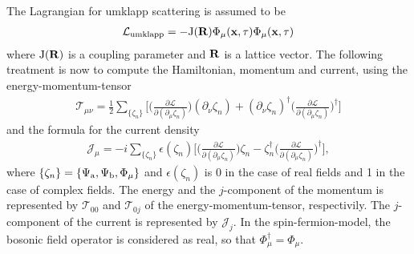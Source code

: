 %
The Lagrangian for umklapp scattering is assumed to be 
%
\begin{align}
	\mathcal{L}_{\mathrm{umklapp}}= -\mathrm{J}(\vb{R}) \Phi_{\mu}(\vb{x},\tau) \Phi_{\mu}(\vb{x},\tau)
\end{align}
%
where $\mathrm{J}(\vb{R})$ is a coupling parameter and $\vb{R}$ is a lattice vector.
The following treatment is now to compute the Hamiltonian, momentum and current, using the energy-momentum-tensor
%
\begin{align}
	\mathcal{T}_{\mu\nu} = 
		\frac{1}{2} \sum\limits_{\{\zeta_{n}\}} \bigg[ 
		\Big(\frac{\partial\mathcal{L}}{\partial(\partial_{\mu}\zeta_{n})}\Big) (\partial_{\nu}\zeta_{n}) 
		+
		(\partial_{\nu}\zeta_{n})^{\dag} \Big(\frac{\partial\mathcal{L}}{\partial(\partial_{\mu}\zeta_{n})}\Big)^{\dag}
		\bigg]
\end{align}
%
and the formula for the current density
%
\begin{align}
	\mathcal{J}_{\mu} = -i \sum\limits_{\{\zeta_{n}\}} \epsilon(\zeta_{n}) \bigg[
		\Big(\frac{\partial\mathcal{L}}{\partial(\partial_{\mu}\zeta_{n})}\Big) \zeta_{n}
		-
		\zeta_{n}^{\dag} \Big(\frac{\partial\mathcal{L}}{\partial(\partial_{\mu}\zeta_{n})}\Big)^{\dag}
		\bigg],
\end{align}
%
where $\{\zeta_{n}\} = \{\Psi_{\mathrm{a}},\Psi_{\mathrm{b}}, \Phi_{\mu}\}$ and $\epsilon(\zeta_{n})$ is 0 in the case of real fields and 1 in the case of complex fields.
The energy and the $j$-component of the momentum is represented by $\mathcal{T}_{00}$ and $\mathcal{T}_{0j}$ of the energy-momentum-tensor, respectivily.
The $j$-component of the current is represented by $\mathcal{J}_{j}$.
In the spin-fermion-model, the bosonic field operator is considered as real, so that $\Phi_{\mu}^{\dag} = \Phi_{\mu}$.












































